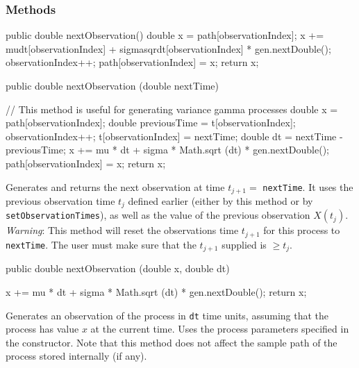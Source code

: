 \subsubsection* {Methods}
\begin{code} \begin{hide}

   public double nextObservation() {
        double x = path[observationIndex];
        x += mudt[observationIndex]
             + sigmasqrdt[observationIndex] * gen.nextDouble();
        observationIndex++;
        path[observationIndex] = x;
        return x;
    }

\end{hide}
   public double nextObservation (double nextTime) \begin{hide} {
        // This method is useful for generating variance gamma processes
        double x = path[observationIndex];
        double previousTime = t[observationIndex];
        observationIndex++;
        t[observationIndex] = nextTime;
        double dt = nextTime - previousTime;
        x += mu * dt + sigma * Math.sqrt (dt) * gen.nextDouble();
        path[observationIndex] = x;
        return x;
    }\end{hide}
\end{code}
\begin{tabb} Generates and returns the next observation at time $t_{j+1} =$
 \texttt{nextTime}. It uses the previous observation time $t_{j}$ defined earlier
(either by this method or by \texttt{setObservationTimes}),
as well as the value of the previous observation $X(t_j)$.
\emph{Warning}: This method will reset the observations time $t_{j+1}$
for this process to \texttt{nextTime}. The user must make sure that
the $t_{j+1}$ supplied is $\geq t_{j}$.
\end{tabb}
\begin{code}

   public double nextObservation (double x, double dt) \begin{hide} {
        x += mu * dt + sigma * Math.sqrt (dt) * gen.nextDouble();
        return x;
    }\end{hide}
\end{code}
\begin{tabb} Generates an observation of the process in \texttt{dt} time units,
assuming that the process has value $x$ at the current time.
Uses the process parameters specified in the constructor.
Note that this method does not affect the sample path of the process
stored internally (if any).
\end{tabb}
